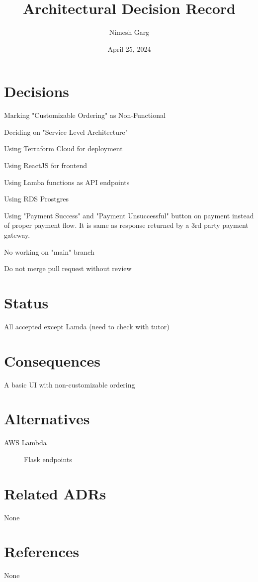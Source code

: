\documentclass{article}
\title{Architectural Decision Record}
\author{Nimesh Garg}
\date{April 25, 2024}
\begin{document}
\maketitle

\section{Decisions}
\begin{description}
\item Marking "Customizable Ordering" as Non-Functional   
\item Deciding on "Service Level Architecture" 
\item Using Terraform Cloud for deployment
\item Using ReactJS for frontend
\item Using Lamba functions as API endpoints
\item Using RDS Prostgres
\item Using "Payment Success" and "Payment Unsuccessful" button on payment instead of proper payment flow. It is same as response returned by a 3rd party payment gateway.
\item No working on "main" branch
\item Do not merge pull request without review
\end{description}

\section{Status}
\begin{description}
    \item All accepted except Lamda (need to check with tutor)
\end{description}

\section{Consequences}
\begin{description}
    \item A basic UI with non-customizable ordering
\end{description}

\section{Alternatives}
\begin{description}
    \item[AWS Lambda] Flask endpoints
\end{description}


\section{Related ADRs}
None

\section{References}
None
\end{document}

